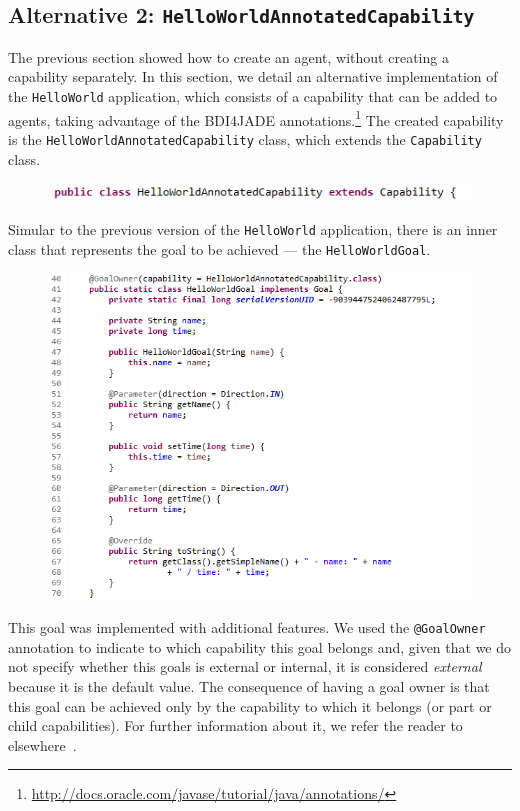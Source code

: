 \documentclass{article}
\begin{document}
\subsection{Alternative 2: \texttt{HelloWorldAnnotatedCapability}}\label{sec:hwCapability}

The previous section showed how to create an agent, without creating a capability separately. In this section, we detail an alternative implementation of the \texttt{HelloWorld} application, which consists of a capability that can be added to agents, taking advantage of the BDI4JADE annotations.\footnote{\url{http://docs.oracle.com/javase/tutorial/java/annotations/}} The created capability is the \texttt{HelloWorldAnnotatedCapability} class, which extends the \texttt{Capability} class.

\begin{figure}[!h]
\centering
\includegraphics[width=\linewidth]{capability}
\label{fig:capability}
\end{figure}

Simular to the previous version of the \texttt{HelloWorld} application, there is an inner class that represents the goal to be achieved --- the \texttt{HelloWorldGoal}.

\begin{figure}[!h]
\centering
\includegraphics[width=\linewidth]{hellogoaal}
\label{fig:hellogoal}
\end{figure}

This goal was implemented with additional features. We used the \texttt{@GoalOwner} annotation to indicate to which capability this goal belongs and, given that we do not specify whether this goals is external or internal, it is considered \emph{external} because it is the default value. The consequence of having a goal owner is that this goal can be achieved only by the capability to which it belongs (or part or child capabilities). For further information about it, we refer the reader to elsewhere~\cite{Nunes:EMAS2014:CapabilityRelationships,Nunes:EMAS2014PostProc:CapabilityRelationships}.
\end{document}
